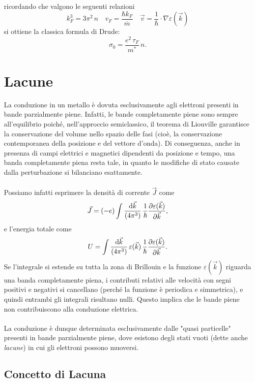 ricordando che valgono le seguenti relazioni 
\[
 k_F^3 = 3\pi^2\, n \quad v_F = \frac{\hbar k_F}{\overline{m}} \quad \vec{v} = \frac{1}{\hbar}\cdot\nabla\varepsilon(\vec{k}) 
\]
si ottiene la classica formula di Drude:
\[
\sigma_0 = \frac{e^2\,\tau_F}{m^*}\, n.
\]
\vspace{1em}
\section{Lacune}
La conduzione in un metallo è dovuta esclusivamente agli elettroni presenti in bande parzialmente piene. Infatti, le bande completamente piene sono sempre all'equilibrio poiché, nell'approccio semiclassico, il teorema di Liouville garantisce la conservazione del volume nello spazio delle fasi (cioè, la conservazione contemporanea della posizione e del vettore d'onda). Di conseguenza, anche in presenza di campi elettrici e magnetici dipendenti da posizione e tempo, una banda completamente piena resta tale, in quanto le modifiche di stato causate dalla perturbazione si bilanciano esattamente.\\\\
Possiamo infatti esprimere la densità di corrente \(\vec{J}\) come
\begin{equation}
    \vec{J} = (-e) \int \frac{\text{d}\vec{k}}{(4\pi^3)} \, \frac{1}{\hbar}\frac{\partial \varepsilon(\vec{k})}{\partial \vec{k}},
\end{equation}
e l'energia totale come
\begin{equation}
    U = \int \frac{\text{d}\vec{k}}{(4\pi^3)} \, \varepsilon(\vec{k}) \,\frac{1}{\hbar}\frac{\partial \varepsilon(\vec{k})}{\partial \vec{k}}.
\end{equation}
Se l'integrale si estende su tutta la zona di Brillouin e la funzione \(\varepsilon(\vec{k})\) riguarda una banda completamente piena, i contributi relativi alle velocità con segni positivi e negativi si cancellano (perché la funzione è periodica e simmetrica), e quindi entrambi gli integrali risultano nulli. Questo implica che le bande piene non contribuiscono alla conduzione elettrica.\\\\
La conduzione è dunque determinata esclusivamente dalle "quasi particelle" presenti in bande parzialmente piene, dove esistono degli stati vuoti (dette anche \emph{lacune}) in cui gli elettroni possono muoversi.

\subsection*{Concetto di Lacuna}

